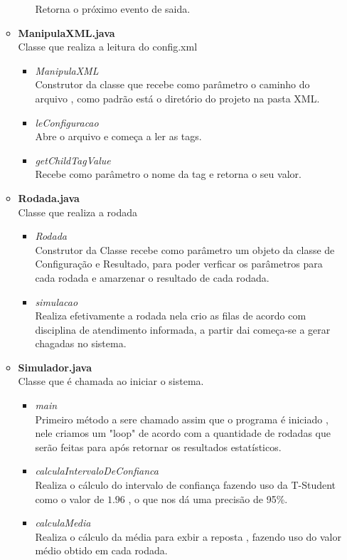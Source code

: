\documentclass[a4paper,10pt]{article}
\begin{document}
\begin{itemize}
\begin{itemize}
\begin{itemize}
			  Retorna o próximo evento de saida.
		    \end{itemize}
		\item \textbf{ManipulaXML.java\\}
		      Classe que realiza a leitura do config.xml
		     \begin{itemize}
			 \item \textit{ManipulaXML\\} 
			  Construtor da classe que recebe como parâmetro o caminho do arquivo , como padrão está o diretório do projeto na pasta XML.
			 \item \textit{leConfiguracao\\} 
			  Abre o arquivo e começa a ler as tags.
			 \item \textit{getChildTagValue\\}
			  Recebe como parâmetro o nome da tag e retorna o seu valor.
		    \end{itemize}
		\item \textbf{Rodada.java\\}
		    Classe que realiza a rodada
		    \begin{itemize}
			\item \textit{Rodada\\}
			Construtor da Classe recebe como parâmetro um objeto da classe de Configuração e Resultado, para poder verficar os parâmetros para cada rodada e amarzenar o resultado de cada rodada.
			\item \textit{simulacao\\}   Realiza efetivamente a rodada nela crio as filas de acordo com disciplina de atendimento informada, a partir dai começa-se a gerar chagadas no sistema.
		    \end{itemize}
		\item \textbf{Simulador.java\\}
		    Classe que é chamada ao iniciar o sistema.
		    \begin{itemize}
			\item \textit{main\\}Primeiro método a sere chamado assim que o programa é iniciado , nele criamos um "loop" de acordo com a quantidade de rodadas que serão feitas para após 
					     retornar os resultados estatísticos.
			\item \textit{calculaIntervaloDeConfianca\\}Realiza o cálculo do intervalo de confiança fazendo uso da T-Student como o valor de $1.96$ , o que nos dá uma precisão de 95\%.
			\item \textit{calculaMedia\\} Realiza o cálculo da média para exbir a reposta , fazendo uso do valor médio obtido em cada rodada.

\end{itemize}
\end{itemize}
\end{itemize}
\end{document}
